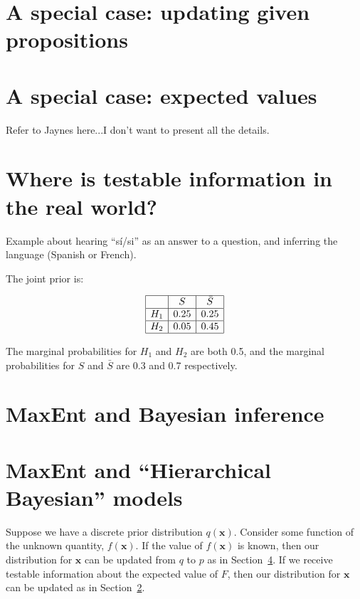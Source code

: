 \documentclass[letterpaper, 11pt]{article}
\newcommand{\xx}{\boldsymbol{x}}
\begin{document}
\section{A special case: updating given propositions}


\section{A special case: expected values}\label{sec:expectations}
Refer to Jaynes here...I don't want to present all the details.

\section{Where is testable information in the real world?}

Example about hearing ``sí/si'' as an answer to a question,
and inferring the language (Spanish or French).

The joint prior is:

\begin{eqnarray}
\begin{array}{|c|c|c|}
\hline
	&	S	& \bar{S}\\
\hline
H_1 & 0.25  & 0.25\\
\hline
H_2 & 0.05 & 0.45\\
\hline
\end{array}
\end{eqnarray}

The marginal probabilities for $H_1$ and $H_2$ are both 0.5, and the
marginal probabilities for $S$ and $\bar{S}$ are 0.3 and 0.7 respectively.


\section{MaxEnt and Bayesian inference}\label{sec:bayes}

\section{MaxEnt and ``Hierarchical Bayesian'' models}
Suppose we have a discrete prior distribution $q(\xx)$. Consider some
function of the unknown quantity, $f(\xx)$.
If the value of $f(\xx)$ is known, then our distribution for $\xx$ can
be updated from $q$ to $p$ as in Section~\ref{sec:bayes}.
If we receive testable information
about the expected value of $F$, then our distribution for $\xx$ can
be updated as in Section~\ref{sec:expectations}.
\end{document}
